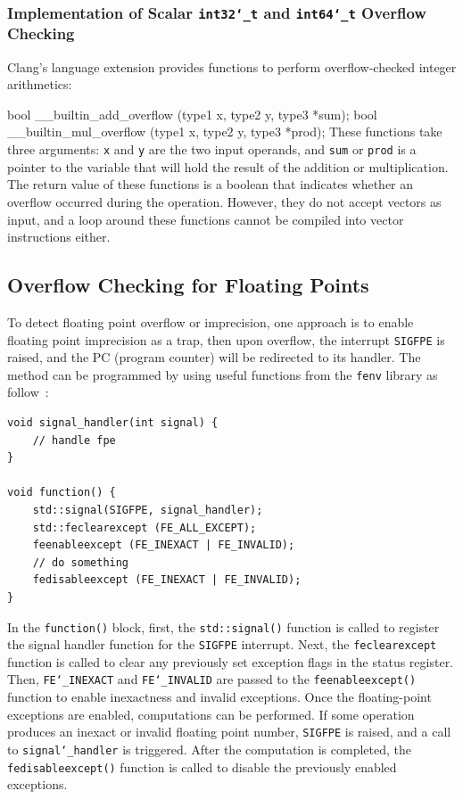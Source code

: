 \documentclass[logo,bsc,singlespacing,parskip]{infthesis}
\newcommand{\sigfpe}{\texttt{SIGFPE}}
\newcommand{\dtint}{\texttt{int32\char`_t}}
\newcommand{\dtlong}{\texttt{int64\char`_t}}
\newcommand{\feinexact}{\texttt{FE\char`_INEXACT}}
\newcommand{\feinvalid}{\texttt{FE\char`_INVALID}}
\newenvironment{VerbatimCompact}
  {\vspace*{-2.5mm}\VerbatimEnvironment
   \par\Verbatim}
  {\endVerbatim\vspace*{-2.4mm}}
\begin{document}
\subsubsection{Implementation of Scalar \dtint{} and \dtlong{}
Overflow Checking} 

Clang's language extension provides functions to perform overflow-checked
integer arithmetics: 
\begin{VerbatimCompact}
bool __builtin_add_overflow (type1 x, type2 y, type3 *sum);
bool __builtin_mul_overflow (type1 x, type2 y, type3 *prod);
\end{VerbatimCompact}
These functions take three arguments: \texttt{x} and \texttt{y} are the two
input operands, and \texttt{sum} or \texttt{prod} is a pointer to the variable
that will hold the result of the addition or multiplication. The return value of
these functions is a boolean that indicates whether an overflow occurred during
the operation. However, they do not accept vectors as input, and a loop around
these functions cannot be compiled into vector instructions either.


\subsection{Overflow Checking for Floating Points}
\label{sec:overflow-float}
To detect floating point overflow or imprecision, one approach is to enable
floating point imprecision as a trap, then upon overflow, the interrupt \sigfpe{}
is raised, and the PC (program counter) will be redirected to its handler. The
method can be programmed by using useful functions from the \texttt{fenv}
library as follow~\cite{fenvlib}:
\begin{verbatim}
void signal_handler(int signal) {
    // handle fpe
}

void function() {
    std::signal(SIGFPE, signal_handler);
    std::feclearexcept (FE_ALL_EXCEPT);
    feenableexcept (FE_INEXACT | FE_INVALID);
    // do something
    fedisableexcept (FE_INEXACT | FE_INVALID);
}
\end{verbatim}

In the \texttt{function()} block, first, the \texttt{std::signal()} function is
called to register the signal handler function for the \sigfpe{} interrupt. Next,
the \texttt{feclearexcept} function is called to clear any previously set
exception flags in the status register. Then, \feinexact{} and \feinvalid{} are
passed to the \texttt{feenableexcept()} function to enable inexactness and
invalid exceptions. Once the floating-point exceptions are enabled, 
computations can be performed. If some operation produces an inexact or invalid
floating point number, \sigfpe{} is raised, and a call to
\texttt{signal\char`_handler} is triggered. After the computation is completed,
the \texttt{fedisableexcept()} function is called to disable the previously
enabled exceptions. 
\end{document}
